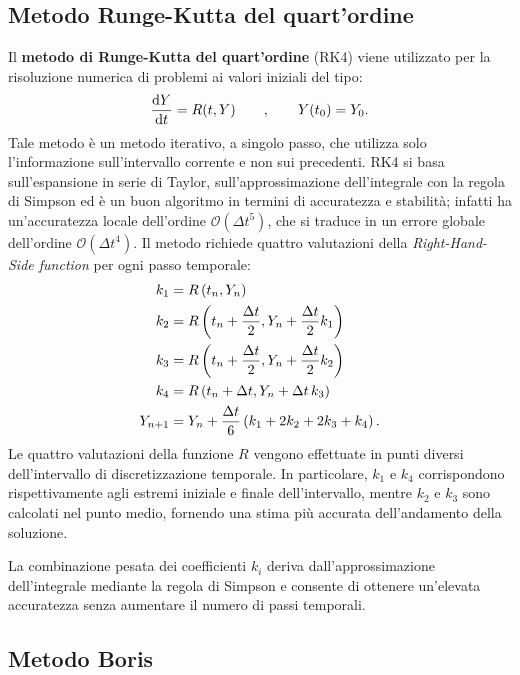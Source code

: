 \documentclass[10pt,a4paper]{article}
\begin{document}
\subsection{Metodo Runge-Kutta del quart'ordine}

Il \textbf{metodo di Runge-Kutta del quart'ordine} (RK4) viene utilizzato per la risoluzione numerica di problemi ai valori iniziali del tipo:
\begin{equation}
    \dv{Y}{t} = R(t,Y) \qquad , \qquad Y(t_0) = Y_0.
\end{equation}
Tale metodo è un metodo iterativo, a singolo passo, che utilizza solo l'informazione sull'intervallo corrente e non sui precedenti. RK4 si basa sull'espansione in serie di Taylor, sull'approssimazione dell'integrale con la regola di Simpson ed è un buon algoritmo in termini di accuratezza e stabilità; infatti ha un'accuratezza locale dell'ordine $\mathcal{O}(\Delta t^5)$, che si traduce in un errore globale dell'ordine $\mathcal{O}(\Delta t^4)$. Il metodo richiede quattro valutazioni della \textit{Right-Hand-Side function} per ogni passo temporale:
\begin{align}
    k_1 &= R\left(t_n, Y_n\right) \notag \\
    k_2 &= R\left(t_n + \frac{\Delta t}{2}, Y_n + \frac{\Delta t}{2}k_1\right) \notag \\
    k_3 &= R\left(t_n + \frac{\Delta t}{2}, Y_n + \frac{\Delta t}{2}k_2\right) \\
    k_4 &= R\left(t_n + \Delta t, Y_n + \Delta t\, k_3\right) \notag \\
    Y_{n+1} &= Y_n + \frac{\Delta t}{6}\left( k_1 + 2k_2 + 2k_3 + k_4 \right). \notag
\end{align}
Le quattro valutazioni della funzione $R$ vengono effettuate in punti diversi dell'intervallo di discretizzazione temporale. In particolare, $k_1$ e $k_4$ corrispondono rispettivamente agli estremi iniziale e finale dell'intervallo, mentre $k_2$ e $k_3$ sono calcolati nel punto medio, fornendo una stima più accurata dell'andamento della soluzione.

La combinazione pesata dei coefficienti $k_i$ deriva dall'approssimazione dell'integrale mediante la regola di Simpson e consente di ottenere un'elevata accuratezza senza aumentare il numero di passi temporali.


\subsection{Metodo Boris\label{sctn:metodo Boris}}
\end{document}
